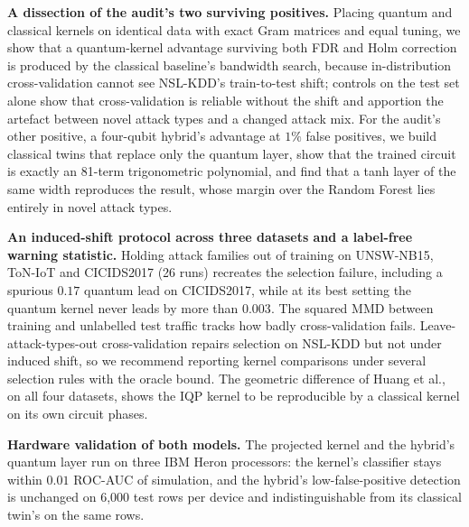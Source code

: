 \item \textbf{A dissection of the audit's two surviving positives.} Placing quantum and classical kernels
on identical data with exact Gram matrices and equal tuning, we show that a quantum-kernel advantage
surviving both FDR and Holm correction is produced by the classical baseline's bandwidth search, because
in-distribution cross-validation cannot see NSL-KDD's train-to-test shift; controls on the test set
alone show that cross-validation is reliable without the shift and apportion the artefact between novel
attack types and a changed attack mix. For the audit's other positive, a four-qubit hybrid's advantage at
$1\%$ false positives, we build classical twins that replace only the quantum layer, show that the
trained circuit is exactly an 81-term trigonometric polynomial, and find that a tanh layer of the same
width reproduces the result, whose margin over the Random Forest lies entirely in novel attack types.
\item \textbf{An induced-shift protocol across three datasets and a label-free warning statistic.}
Holding attack families out of training on UNSW-NB15, ToN-IoT and CICIDS2017 (26 runs) recreates the
selection failure, including a spurious $0.17$ quantum lead on CICIDS2017, while at its best setting the
quantum kernel never leads by more than $0.003$. The squared MMD between training and unlabelled test
traffic tracks how badly cross-validation fails. Leave-attack-types-out cross-validation repairs
selection on NSL-KDD but not under induced shift, so we recommend reporting kernel comparisons under
several selection rules with the oracle bound. The geometric difference of Huang et al., on all four
datasets, shows the IQP kernel to be reproducible by a classical kernel on its own circuit phases.
\item \textbf{Hardware validation of both models.} The projected kernel and the hybrid's quantum layer
run on three IBM Heron processors: the kernel's classifier stays within $0.01$ ROC-AUC of simulation,
and the hybrid's low-false-positive detection is unchanged on 6{,}000 test rows per device and
indistinguishable from its classical twin's on the same rows.
